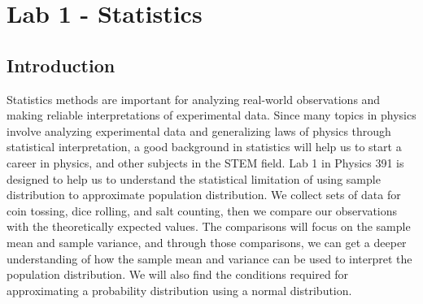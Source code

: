 \documentclass[11pt]{book}
\theoremstyle{break}
\theoremstyle{break}
\begin{document}
\newpage
\tableofcontents
{}


\setcounter{chapter}{1}
\chapter*{Lab 1 - Statistics}
\section{Introduction}

Statistics methods are important for analyzing real-world observations and making reliable interpretations of experimental data. Since many topics in physics involve analyzing experimental data and generalizing laws of physics through statistical interpretation, a good background in statistics will help us to start a career in physics, and other subjects in the STEM field. Lab 1 in Physics 391 is designed to help us to understand the statistical limitation of using sample distribution to approximate population distribution. We collect sets of data for coin tossing, dice rolling, and salt counting, then we compare our observations with the theoretically expected values. The comparisons will focus on the sample mean and sample variance, and through those comparisons, we can get a deeper understanding of how the sample mean and variance can be used to interpret the population distribution. We will also find the conditions required for approximating a probability distribution using a normal distribution. 

\hfill\break
\hfill\break
\end{document}
